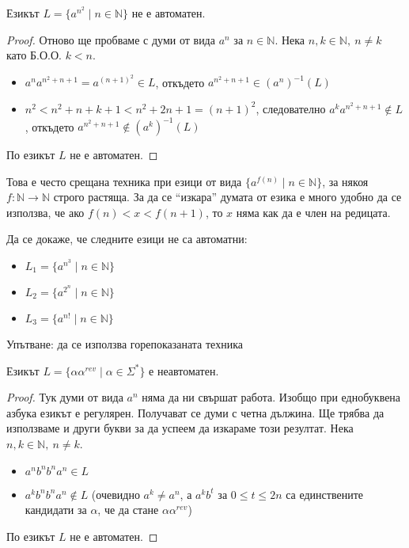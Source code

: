 \begin{claim}
    Езикът $L = \{ a^{n^2} \mid n \in \mathbb{N} \}$ не е автоматен.
\end{claim}

\begin{proof}
    Отново ще пробваме с думи от вида $a^n$ за $n \in \mathbb{N}$.
    Нека $n, k \in \mathbb{N}, \: n \neq k$ като Б.О.О. $k < n$.
    \begin{itemize}
        \item $a^na^{n^2+n+1} = a^{(n+1)^2} \in L$, откъдето $a^{n^2+n+1} \in (a^n)^{-1}(L)$
        \item $n^2 < n^2+n+k+1 < n^2+2n+1=(n+1)^2$, следователно $a^ka^{n^2+n+1} \notin L$, откъдето $a^{n^2+n+1} \notin (a^k)^{-1}(L)$
    \end{itemize}
    По  езикът $L$ не е автоматен.
\end{proof}

Това е често срещана техника при езици от вида $\{ a^{f(n)} \mid n \in \mathbb{N} \}$, за някоя $f : \mathbb{N} \rightarrow \mathbb{N}$ строго растяща.
За да се ``изкара'' думата от езика е много удобно да се използва, че ако $f(n) < x < f(n+1)$, то $x$ няма как да е член на редицата.

\begin{problem}
Да се докаже, че следните езици не са автоматни:
\begin{itemize}
    \item $L_1 = \{ a^{n^3} \mid n \in \mathbb{N} \}$
    \item $L_2 = \{ a^{2^n} \mid n \in \mathbb{N} \}$
    \item $L_3 = \{ a^{n!} \mid n \in \mathbb{N} \}$
\end{itemize}
Упътване: да се използва горепоказаната техника
\end{problem}

\begin{claim}
    Езикът $L = \{ \alpha \alpha^{rev} \mid \alpha \in \Sigma^* \}$ е неавтоматен.
\end{claim}

\begin{proof}
    Тук думи от вида $a^n$ няма да ни свършат работа.
    Изобщо при еднобуквена азбука езикът е регулярен.
    Получават се думи с четна дължина.
    Ще трябва да използваме и други букви за да успеем да изкараме този резултат.
    Нека $n, k \in \mathbb{N}, \: n \neq k$.
    \begin{itemize}
        \item $a^nb^nb^na^n \in L$
        \item $a^kb^nb^na^n \notin L$ (очевидно $a^k \neq a^n$, а $a^kb^t$ за $0 \leq t \leq 2n$ са единствените кандидати за $\alpha$, че да стане $\alpha \alpha^{rev}$)
    \end{itemize}
    По  езикът $L$ не е автоматен.
\end{proof}

